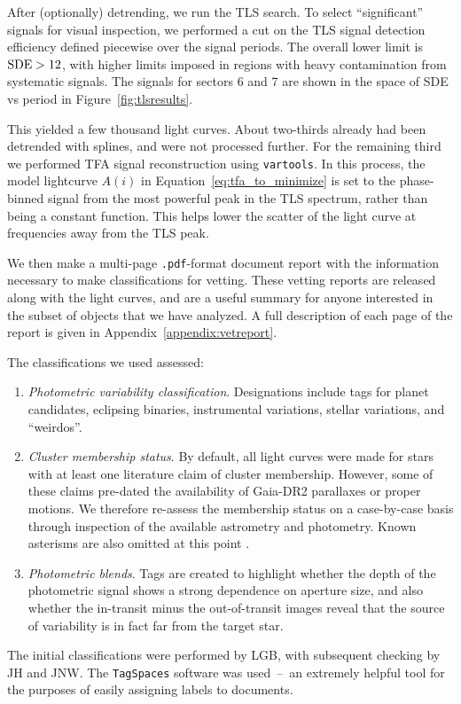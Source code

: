 \documentclass[12pt,twocolumn,tighten]{aastex62}
\begin{document}
After (optionally) detrending, we run the TLS search. To select
``significant'' signals for visual inspection, we performed a cut on
the TLS signal detection efficiency defined piecewise over the signal
periods.  The overall lower limit is ${\rm SDE} > 12$, with higher
limits imposed in regions with heavy contamination from systematic
signals.  The signals for sectors 6 and 7 are shown in the space of
SDE vs period in Figure~\ref{fig:tlsresults}.

This yielded a few thousand light curves.  About two-thirds already
had been detrended with splines, and were not processed further.  For
the remaining third we performed TFA signal reconstruction using
\texttt{vartools}.  In this process, the model lightcurve $A(i)$ in
Equation~\ref{eq:tfa_to_minimize} is set to the phase-binned signal
from the most powerful peak in the TLS spectrum, rather than being a
constant function.  This helps lower the scatter of the light curve at
frequencies away from the TLS peak.

We then make a multi-page \texttt{.pdf}-format document report with
the information necessary to make classifications for vetting.  These
vetting reports are released along with the light curves, and are a
useful summary for anyone interested in the subset of objects that we
have analyzed.  A full description of each page of the report is given
in Appendix~\ref{appendix:vetreport}.

The classifications we used assessed:
\begin{enumerate}
    \item {\it Photometric variability classification}. Designations
      include tags for planet candidates, eclipsing binaries,
      instrumental variations, stellar variations, and ``weirdos''.
    \item {\it Cluster membership status}. By default, all light
      curves were made for stars with at least one literature claim of
      cluster membership.  However, some of these claims pre-dated the
      availability of Gaia-DR2 parallaxes or proper motions.  We
      therefore re-assess the membership status on a case-by-case
      basis through inspection of the available astrometry and
      photometry.  Known asterisms are also omitted at this point
      \citep[{\it
      e.g.},][]{sulentic_revised_1973,baumgardt_asterisms_1998,kos_galah_2018}.
    \item {\it Photometric blends}. Tags are created to highlight
      whether the depth of the photometric signal shows a strong
      dependence on aperture size, and also whether the in-transit
      minus the out-of-transit images reveal that the source of
      variability is in fact far from the target star.
\end{enumerate}
The initial classifications were performed by LGB, with subsequent
checking by JH and JNW.  The \texttt{TagSpaces} software was
used~--~an extremely helpful tool for the purposes of easily assigning
labels to documents.
\end{document}
